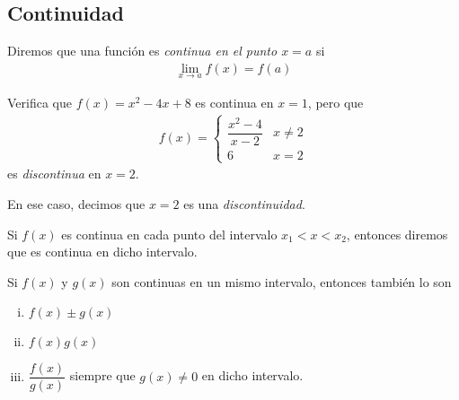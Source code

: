 \subsection{Continuidad}

  Diremos que una función es \emph{continua en el punto $x=a$} si
  \begin{align*}
   \lim_{x\to a} f(x)=f(a)
   \end{align*}

  \begin{resuelto}
   Verifica que $f(x)=x^{2}-4x+8$ es continua en $x=1$, pero que
   \begin{align*}
   f(x)=
    \begin{cases}
\dfrac{x^2-4}{x-2}& x\neq 2\\
6 & x= 2
\end{cases}
    \end{align*}
    es \emph{discontinua} en $x=2$.

    En ese caso, decimos que $x=2$ es una \emph{discontinuidad}.
  \end{resuelto}


\begin{definicion}
	Si $f(x)$ es continua en cada punto del intervalo $x_{1}<x<x_{2}$, entonces diremos que es continua en dicho intervalo.
\end{definicion}

  \begin{proposicion}
   Si $f(x)$ y $g(x)$ son continuas en un mismo intervalo, entonces también lo son
   \begin{enumerate}[(i)]
     \item $f(x)\pm g(x)$

     \item $f(x)g(x)$

     \item $\dfrac{f(x)}{g(x)}$ siempre que $g(x)\neq 0$ en dicho intervalo.
\end{enumerate}
  \end{proposicion}

